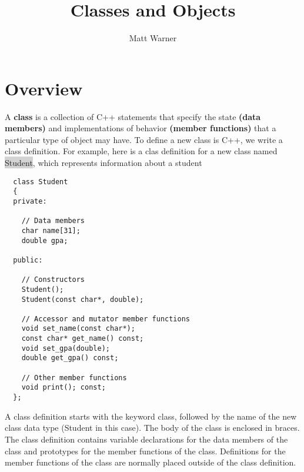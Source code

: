 \documentclass{report}
\title{\Huge{Classes and Objects}}
\author{\huge{Matt Warner}}
\date{\huge{}}
\begin{document}
  \maketitle
  \tableofcontents
  \newpage
  \section{Overview}
  \noindent
  A \textbf{class} is a collection of C++ statements that specify the state \textbf{(data members)} and implementations of behavior \textbf{(member functions)} that a particular type of object may have.
  \bigbreak \noindent
  \bigbreak \noindent
  To define a new class is C++, we write a class definition. For example, here is a clas definition for a new class named \colorbox{lightgray}{Student}, which represents information about a student
  \begin{mdframed}
  \begin{verbatim}
  class Student
  {
  private:

    // Data members
    char name[31];
    double gpa;

  public:
    
    // Constructors
    Student();
    Student(const char*, double);
    
    // Accessor and mutator member functions
    void set_name(const char*);
    const char* get_name() const;
    void set_gpa(double);
    double get_gpa() const;

    // Other member functions
    void print(); const;
  };
  \end{verbatim}
\end{mdframed}
  A class definition starts with the keyword class, followed by the name of the new class data type (Student in this case). The body of the class is enclosed in braces.
  \bigbreak \noindent
  The class definition contains variable declarations for the data members of the class and prototypes for the member functions of the class.
  \bigbreak \noindent
  Definitions for the member functions of the class are normally placed outside of the class definition.
  \bigbreak \noindent
  \newpage
\end{document}
